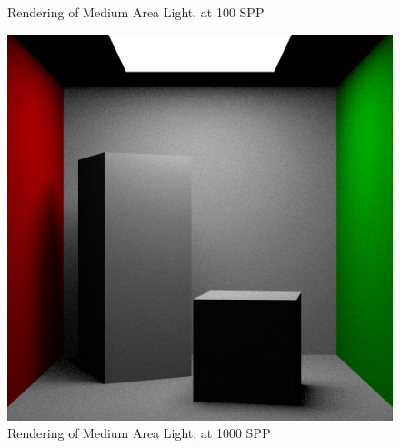 \documentclass[a4paper]{myarticle}
\begin{document}
\begin{figure}[H]
\begin{minipage}[t]{.3\textwidth}
      \caption{Rendering of Medium Area Light, at 100 SPP}
  \end{minipage}
  \hfill
  \begin{minipage}[t]{.3\textwidth}
      \centering
      \includegraphics[width=\textwidth]{q3/med_0_1000.png}
      \caption{Rendering of Medium Area Light, at 1000 SPP}
  \end{minipage}
\end{figure}
\end{document}
